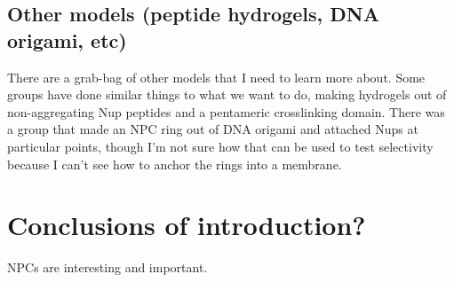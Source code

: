 \subsection{Other models (peptide hydrogels, DNA origami, etc)}
There are a grab-bag of other models that I need to learn more about.  Some groups have done similar things to what we want to do, making hydrogels out of non-aggregating Nup peptides and a pentameric crosslinking domain.  There was a group that made an NPC ring out of DNA origami and attached Nups at particular points, though I'm not sure how that can be used to test selectivity because I can't see how to anchor the rings into a membrane.
\section{Conclusions of introduction?}
NPCs are interesting and important.

%
%
%

